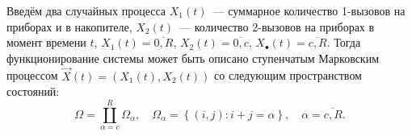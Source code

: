 %
Введём два случайных процесса $X_1 (t)$~--- суммарное количество
1-вызовов на приборах и в накопителе, $X_2 (t)$~--- количество
2-вызовов на приборах в момент времени $t$, $X_1 (t) = \overline {0,R}
$, $X_2 (t) = \overline {0,c} $, $X_\bullet (t) = \overline {c,R}
$. Тогда функционирование системы может быть описано ступенчатым
Марковским процессом $\overrightarrow X (t) = (X_1 (t),X_2 (t))$ со
следующим пространством состояний:
\begin{equation}
\label{eq:01}
\Omega = \coprod\limits_{\alpha = c}^R \Omega _\alpha , \quad 
\Omega _\alpha = \left\{ {(i,j):i + j = \alpha } 
\right\}, \quad \alpha = \overline {c,R}.
\end{equation}




